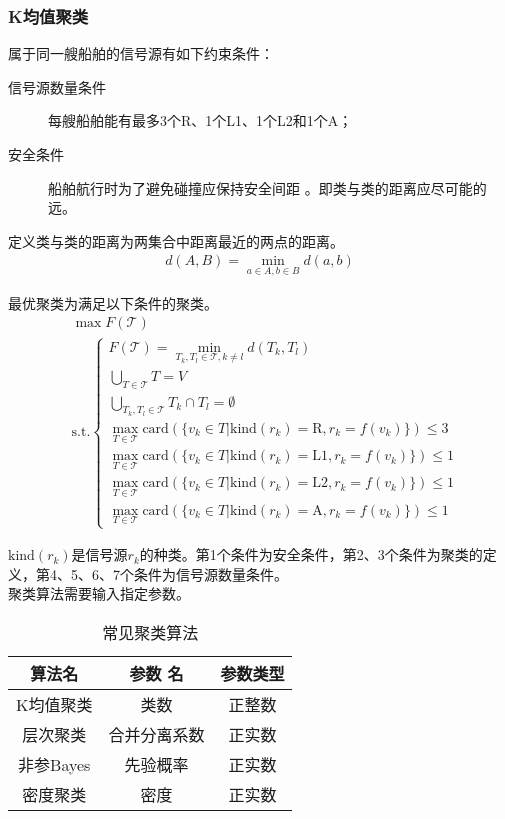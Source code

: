 \subsubsection{K均值聚类}
属于同一艘船舶的信号源有如下约束条件：
\begin{description}
	\item[信号源数量条件]每艘船舶能有最多3个R、1个L1、1个L2和1个A；
	\item[安全条件]船舶航行时为了避免碰撞应保持安全间距\cite{safe} 。即类与类的距离应尽可能的远。
\end{description}
\par 定义类与类的距离为两集合中距离最近的两点的距离。
\begin{align}
	d(A,B)=\min\limits_{a\in A,b\in B}d(a,b)
\end{align}
\par 最优聚类为满足以下条件的聚类。
\begin{align}
	&	\max F(\mathscr{T})	\\
	&	\mathrm{s.t.}
	\begin{cases}
		F(\mathscr{T})=\min\limits_{T_k,T_l\in \mathscr{T},k\neq l}d(T_k,T_l)										\\
		\bigcup\limits_{T\in\mathscr{T}}T=V																\\
		\bigcup\limits_{T_k,T_l\in\mathscr{T}}T_k\cap T_l=\emptyset											\\
		\max\limits_{T\in\mathscr{T}}\mathrm{card}(\{v_k\in T|\mathrm{kind}(r_k)=\mathrm{R},r_k=f(v_k)\})	\leqslant3		\\
		\max\limits_{T\in\mathscr{T}}\mathrm{card}(\{v_k\in T|\mathrm{kind}(r_k)=\mathrm{L1},r_k=f(v_k)\})\leqslant1	\\
		\max\limits_{T\in\mathscr{T}}\mathrm{card}(\{v_k\in T|\mathrm{kind}(r_k)=\mathrm{L2},r_k=f(v_k)\})\leqslant1	\\
		\max\limits_{T\in\mathscr{T}}\mathrm{card}(\{v_k\in T|\mathrm{kind}(r_k)=\mathrm{A},r_k=f(v_k)\})	\leqslant1
	\end{cases}
\end{align}
\par\(\mathrm{kind}(r_k)\)是信号源\(r_k\)的种类。第1个条件为安全条件，第2、3个条件为聚类的定义，第4、5、6、7个条件为信号源数量条件。
\\\indent 聚类算法需要输入指定参数。
\begin{table}[htbp]
	\centering
	\caption{常见聚类算法}
	\begin{tabular}{ccc}
		\toprule
		算法名					&	参数	名		&	参数类型	\\
		\midrule
		K均值聚类				&	类数			&	正整数	\\
		层次聚类					&	合并分离系数	&	正实数	\\
		非参Bayes\index{Bayes}	&	先验概率		&	正实数	\\
		密度聚类					&	密度			&	正实数	\\
		\bottomrule
	\end{tabular}
\end{table}
